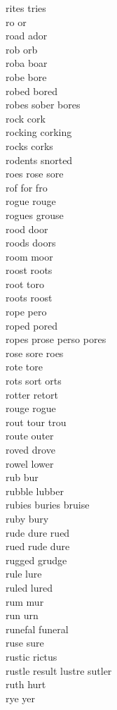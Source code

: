 rites tries\\
ro or\\
road ador\\
rob orb\\
roba boar\\
robe bore\\
robed bored\\
robes sober bores\\
rock cork\\
rocking corking\\
rocks corks\\
rodents snorted\\
roes rose sore\\
rof for fro\\
rogue rouge\\
rogues grouse\\
rood door\\
roods doors\\
room moor\\
roost roots\\
root toro\\
roots roost\\
rope pero\\
roped pored\\
ropes prose perso pores\\
rose sore roes\\
rote tore\\
rots sort orts\\
rotter retort\\
rouge rogue\\
rout tour trou\\
route outer\\
roved drove\\
rowel lower\\
rub bur\\
rubble lubber\\
rubies buries bruise\\
ruby bury\\
rude dure rued\\
rued rude dure\\
rugged grudge\\
rule lure\\
ruled lured\\
rum mur\\
run urn\\
runefal funeral\\
ruse sure\\
rustic rictus\\
rustle result lustre sutler\\
ruth hurt\\
rye yer\\

